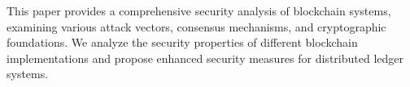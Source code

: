 This paper provides a comprehensive security analysis of blockchain systems, examining various attack vectors, consensus mechanisms, and cryptographic foundations. We analyze the security properties of different blockchain implementations and propose enhanced security measures for distributed ledger systems.